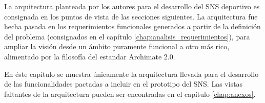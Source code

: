 La arquitectura planteada por los autores para el desarrollo del SNS deportivo es consignada en los puntos de vista de las secciones siguientes. La arquitectura fue hecha pasada en los requerimientos funcionales generados a partir de la definición del problema (consignados en el capítulo \ref{chap:analisis_requerimientos}), para ampliar la visión desde un ámbito puramente funcional a otro más rico, alimentado por la filosofía del estandar Archimate 2.0.

En éste capítulo se muestra únicamente la arquitectura llevada para el desarrollo de las funcionalidades pactadas a incluir en el prototipo del SNS. Las vistas faltantes de la arquitectura pueden ser encontradas en el capítulo \ref{chap:anexos}.

